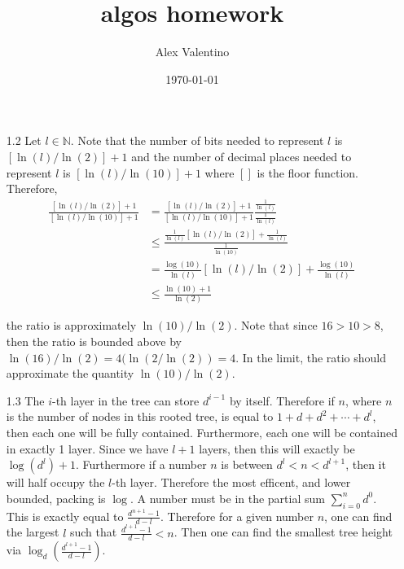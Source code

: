 \documentclass[12pt, letterpaper]{article}
\date{\today}
\author{Alex Valentino}
\title{algos homework}
\newcommand{\N}{\mathbb{N}}
\begin{document}
\begin{enumerate}
	\item[1.2] Let $l \in \N$.  Note that the number of bits needed to represent $l$ is
	$[\ln(l)/\ln(2)] + 1$ and the number of decimal places needed to represent
	$l$ is $[\ln(l)/\ln(10)] + 1$ where $[]$ is the floor function. Therefore, 
	\begin{align*}
		\frac{[\ln(l)/\ln(2)] + 1}{[\ln(l)/\ln(10)] + 1} &=
		\frac{[\ln(l)/\ln(2)] + 1}{[\ln(l)/\ln(10)] + 1} \frac{\frac{1}{\ln(l)}}{\frac{1}{\ln(l)}}\\
		&\leq \frac{\frac{1}{\ln(l)}[\ln(l)/\ln(2)] + \frac{1}{\ln(l)}}{\frac{1}{\ln(10)}}\\
		&= \frac{\log(10)}{\ln(l)}[\ln(l)/\ln(2)] + \frac{\log(10)}{\ln(l)}\\
		&\leq \frac{\ln(10) + 1}{\ln(2)}
	\end{align*}
	
	
	the ratio
	is approximately $\ln(10)/\ln(2)$.  Note that since $16 > 10 > 8$, then the ratio 
	is bounded above by $\ln(16)/\ln(2) = 4 (\ln(2/\ln(2)) = 4$.  In the limit, the 
	ratio should approximate the quantity $\ln(10)/\ln(2)$.  
	\item[1.3] The $i$-th layer in the tree can store $d^{i-1}$ by itself.  Therefore 
	if $n$, where $n$ is the number of nodes in this rooted tree, is equal to 
	$1 + d + d^2 + \cdots + d^l$, then each one will be fully contained.  Furthermore,
	each one will be contained in exactly 1 layer.  Since we have $l+1$ layers, then 
	this will exactly be $\log(d^l) + 1$.  Furthermore if a number $n$ is between 
	$d^l < n < d^{l+1}$, then it will half occupy the $l$-th layer.  Therefore the 
	most efficent, and lower bounded, packing is $\log$.  A number must be in the 
	partial sum $\sum_{i=0}^n d^0$.  This is exactly equal to $\frac{d^{n+1}-1}{d-l}$.
	Therefore for a given number $n$, one can find the largest $l$ such that 
	$\frac{d^{l+1}-1}{d-l} < n$.  Then one can find the smallest tree height via 
	$\log_d(\frac{d^{l+1}-1}{d-l})$.    
	

\end{enumerate}
\end{document}

